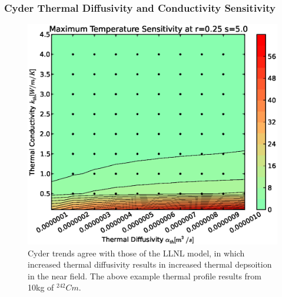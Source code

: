 \begin{frame}[ctb!]
\frametitle{Cyder Thermal Diffusivity and Conductivity Sensitivity}
\footnotesize{
\begin{figure}[htbp!]
\begin{center}
\includegraphics[height=0.7\textheight]{./thermal_demonstration/diffusivity/ak.eps}
\caption[$\alpha_{th}$ vs. $K_{th}$ Sensitivity in Cyder]{Cyder trends agree
with those of the LLNL model, in which increased thermal diffusivity results in 
increased thermal depsoition in the near field. The above example thermal 
profile results from 10kg of $^{242}Cm$.} 
\label{fig:ar}
\end{center}
\end{figure}
}
\end{frame}


